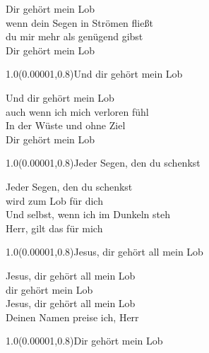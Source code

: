 \documentclass[aspectratio=169]{beamer}
\begin{document}
\color{white}
\begin{frame}
\centering
\color{white}
\huge{Dir gehört mein Lob} \\
\huge{wenn dein Segen in Strömen fließt} \\
\huge{du mir mehr als genügend gibst} \\
\huge{Dir gehört mein Lob} \\

\begin{textblock}{1.0}(0.00001,0.8)\color{gray}\normalsize{Und dir gehört mein Lob}\end{textblock}
\end{frame}

\begin{frame}
\centering
\color{white}
\huge{Und dir gehört mein Lob} \\
\huge{auch wenn ich mich verloren fühl} \\
\huge{In der Wüste und ohne Ziel} \\
\huge{Dir gehört mein Lob} \\

\begin{textblock}{1.0}(0.00001,0.8)\color{gray}\normalsize{Jeder Segen, den du schenkst}\end{textblock}
\end{frame}

\begin{frame}
\centering
\color{white}
\huge{Jeder Segen, den du schenkst} \\
\huge{wird zum Lob für dich} \\
\huge{Und selbst, wenn ich im Dunkeln steh} \\
\huge{Herr, gilt das für mich} \\

\begin{textblock}{1.0}(0.00001,0.8)\color{gray}\normalsize{Jesus, dir gehört all mein Lob}\end{textblock}
\end{frame}

\begin{frame}
\centering
\color{white}
\huge{Jesus, dir gehört all mein Lob} \\
\huge{dir gehört mein Lob} \\
\huge{Jesus, dir gehört all mein Lob} \\
\huge{Deinen Namen preise ich, Herr} \\

\begin{textblock}{1.0}(0.00001,0.8)\color{gray}\normalsize{Dir gehört mein Lob}\end{textblock}
\end{frame}
\end{document}
